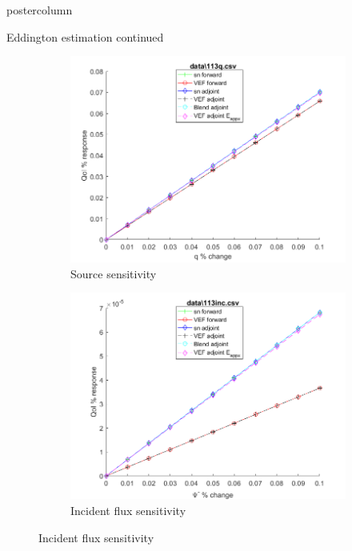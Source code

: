 \documentclass[xcolor={usenames,dvipsnames,svgnames,table}]{beamer}
\begin{document}
\begin{frame}
\begin{columns}
\begin{column}{.33\textwidth}
\begin{beamercolorbox}[center,wd=\textwidth]{postercolumn}
\begin{minipage}[T]{0.95\textwidth}
{\begin{block}{Eddington estimation continued}
\begin{figure}[H]
\label{Case113Sens}
\centering
\begin{subfigure}{.4\textwidth}
  \centering
  \includegraphics[width=.98\linewidth]{113qSens.png}  \caption{Source sensitivity}
  \label{fig:sfig1}
\end{subfigure}%
\begin{subfigure}{.4\textwidth}
  \centering
  \includegraphics[width=.98\linewidth]{113incSens.png}
  \caption{Incident flux sensitivity}
  \label{fig:sfig2}
\end{subfigure}


\end{figure}
\end{block}}
\end{minipage}
\end{beamercolorbox}
\end{column}
\end{columns}
\end{frame}
\end{document}
